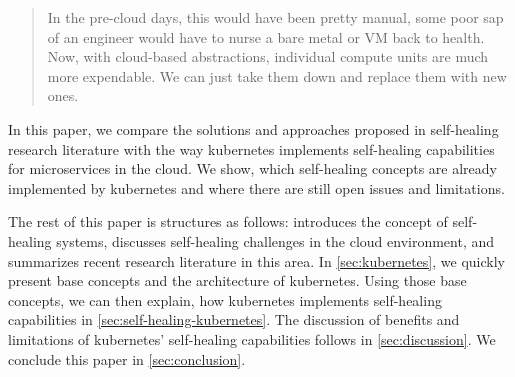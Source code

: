   \begin{quote}
    In the pre-cloud days, this would have been pretty manual, some poor sap of an engineer would have to nurse a bare metal or VM back to health.
    Now, with cloud-based abstractions, individual compute units are much more expendable.
    We can just take them down and replace them with new ones.
  \end{quote}

  In this paper, we compare the solutions and approaches proposed in self-healing research literature with the way \gls{kubernetes} implements self-healing capabilities for microservices in the cloud.
  We show, which self-healing concepts are already implemented by \gls{kubernetes} and where there are still open issues and limitations.

  The rest of this paper is structures as follows:
   introduces the concept of self-healing systems, discusses self-healing challenges in the cloud environment, and summarizes recent research literature in this area.
  In \cref{sec:kubernetes}, we quickly present base concepts and the architecture of \gls{kubernetes}.
  Using those base concepts, we can then explain, how \gls{kubernetes} implements self-healing capabilities in \cref{sec:self-healing-kubernetes}.
  The discussion of benefits and limitations of \gls{kubernetes}' self-healing capabilities follows in \cref{sec:discussion}.
  We conclude this paper in \cref{sec:conclusion}.
